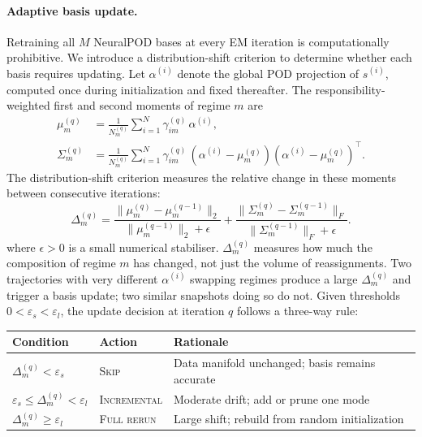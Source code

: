 \documentclass{article}
\begin{document}
\paragraph{Adaptive basis update.}
Retraining all $M$ NeuralPOD bases at every EM iteration is
computationally prohibitive.
We introduce a distribution-shift criterion to determine whether each
basis requires updating.
Let $\alpha^{(i)}$ denote the global POD projection of $s^{(i)}$,
computed once during initialization and fixed thereafter.
The responsibility-weighted first and second moments of regime $m$ are
\begin{align}
  \mu_m^{(q)}
  &= \frac{1}{N_m^{(q)}}\sum_{i=1}^N
    \gamma_{im}^{(q)}\,\alpha^{(i)},
  \label{eq:mu}\\
  \Sigma_m^{(q)}
  &= \frac{1}{N_m^{(q)}}\sum_{i=1}^N
    \gamma_{im}^{(q)}\,
    (\alpha^{(i)}-\mu_m^{(q)})(\alpha^{(i)}-\mu_m^{(q)})^\top.
  \label{eq:Sigma}
\end{align}
The distribution-shift criterion measures the relative change in these
moments between consecutive iterations:
\begin{equation}
  \Delta_m^{(q)}
  = \frac{\|\mu_m^{(q)} - \mu_m^{(q-1)}\|_2}
         {\|\mu_m^{(q-1)}\|_2 + \epsilon}
  + \frac{\|\Sigma_m^{(q)} - \Sigma_m^{(q-1)}\|_F}
         {\|\Sigma_m^{(q-1)}\|_F + \epsilon}.
  \label{eq:Delta}
\end{equation}
\noindent where $\epsilon > 0$ is a small numerical stabiliser.
$\Delta_m^{(q)}$ measures how much the composition of regime $m$ has changed,
not just the volume of reassignments.
Two trajectories with very different $\alpha^{(i)}$ swapping regimes
produce a large $\Delta_m^{(q)}$ and trigger a basis update;
two similar snapshots doing so do not.
Given thresholds $0 < \varepsilon_s < \varepsilon_l$, the update
decision at iteration $q$ follows a three-way rule:

\begin{center}
\renewcommand{\arraystretch}{1.3}\small
\begin{tabular}{lll}
\toprule
Condition & Action & Rationale \\
\midrule
$\Delta_m^{(q)} < \varepsilon_s$
  & \textsc{Skip}
  & Data manifold unchanged; basis remains accurate \\
$\varepsilon_s \le \Delta_m^{(q)} < \varepsilon_l$
  & \textsc{Incremental}
  & Moderate drift; add or prune one mode \\
$\Delta_m^{(q)} \ge \varepsilon_l$
  & \textsc{Full rerun}
  & Large shift; rebuild from random initialization \\
\bottomrule
\end{tabular}
\end{center}
\end{document}
